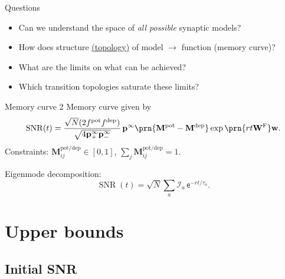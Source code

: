 \documentclass{beamer}%
\DeclareMathOperator{\snr}{SNR}
\newcommand{\pr}{\mathbf{p}}
\newcommand{\eq}{\pr^\infty}
\newcommand{\w}{\mathbf{w}}
\newcommand{\W}{\mathbf{W}}
\newcommand{\frg}{\W^\mathrm{F}}
\newcommand{\M}{\mathbf{M}}
\newcommand{\pot}{^{\text{pot}}}
\newcommand{\dep}{^{\text{dep}}}
\newcommand{\potdep}{^{\text{pot/dep}}}
\newcommand{\initial}{\mathcal{I}}
\renewcommand{\e}{\mathsf{e}}
\begin{document}
\begin{frame}[label=fr_questions]{Questions}
%
 \begin{itemize}
   \item Can we understand the space of \emph{all possible} synaptic models?
   \item How does structure \hyperlink{fr_net<1>}{(topology)} of model $\to$ function (memory curve)?
   \item What are the limits on what can be achieved?
   \item Which transition topologies saturate these limits?
 \end{itemize}
%
\end{frame}


\begin{frame}{Memory curve 2}
%
 Memory curve given by
 \begin{equation*}
   \snr(t) = \frac{\sqrt{N}(2f\pot f\dep)}{\sqrt{4\eq_+\eq_-}}\, \eq \prn{\M\pot-\M\dep}
      \exp\prn{rt\frg}\w.
 \end{equation*}
 Constraints: \qquad $\M\potdep_{ij}\in[0,1]$, \qquad $\sum_j\M\potdep_{ij}=1$.

 \vp Eigenmode decomposition:
 \begin{equation*}
   \snr(t) = \sqrt{N}\sum_a \initial_a \,\e^{-rt/\tau_a}.
 \end{equation*}
%
\end{frame}



\section{Upper bounds}


\subsection{Initial SNR}
\end{document}
